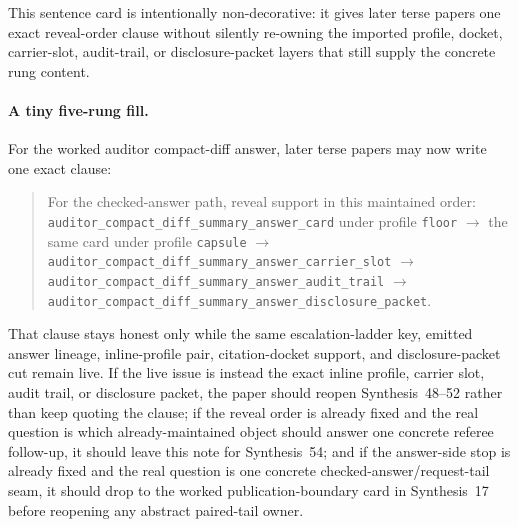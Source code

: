 \documentclass[11pt]{article}
\begin{document}
This sentence card is intentionally non-decorative: it gives later terse papers one exact reveal-order clause without silently re-owning the imported profile, docket, carrier-slot, audit-trail, or disclosure-packet layers that still supply the concrete rung content.\cite{series:workedexample}

\paragraph{A tiny five-rung fill.}
For the worked auditor compact-diff answer, later terse papers may now write one exact clause:
\begin{quote}\small
For the checked-answer path, reveal support in this maintained order: \nolinkurl{auditor_compact_diff_summary_answer_card} under profile \nolinkurl{floor} $\to$ the same card under profile \nolinkurl{capsule} $\to$ \nolinkurl{auditor_compact_diff_summary_answer_carrier_slot} $\to$ \nolinkurl{auditor_compact_diff_summary_answer_audit_trail} $\to$ \nolinkurl{auditor_compact_diff_summary_answer_disclosure_packet}.
\end{quote}
That clause stays honest only while the same escalation-ladder key, emitted answer lineage, inline-profile pair, citation-docket support, and disclosure-packet cut remain live. If the live issue is instead the exact inline profile, carrier slot, audit trail, or disclosure packet, the paper should reopen Synthesis~48--52 rather than keep quoting the clause; if the reveal order is already fixed and the real question is which already-maintained object should answer one concrete referee follow-up, it should leave this note for Synthesis~54; and if the answer-side stop is already fixed and the real question is one concrete checked-answer/request-tail seam, it should drop to the worked publication-boundary card in Synthesis~17 before reopening any abstract paired-tail owner.\cite{series:workedexample}
\end{document}
